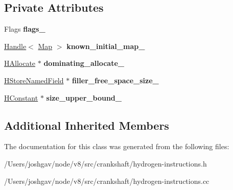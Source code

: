 \subsection*{Private Attributes}
\begin{DoxyCompactItemize}
\item 
Flags {\bfseries flags\+\_\+}\hypertarget{classv8_1_1internal_1_1_h_allocate_a38c796e879659e65ce9782c57d71e6f6}{}\label{classv8_1_1internal_1_1_h_allocate_a38c796e879659e65ce9782c57d71e6f6}

\item 
\hyperlink{classv8_1_1internal_1_1_handle}{Handle}$<$ \hyperlink{classv8_1_1internal_1_1_map}{Map} $>$ {\bfseries known\+\_\+initial\+\_\+map\+\_\+}\hypertarget{classv8_1_1internal_1_1_h_allocate_aa723fca59acf547a7d3f2ffe1f299384}{}\label{classv8_1_1internal_1_1_h_allocate_aa723fca59acf547a7d3f2ffe1f299384}

\item 
\hyperlink{classv8_1_1internal_1_1_h_allocate}{H\+Allocate} $\ast$ {\bfseries dominating\+\_\+allocate\+\_\+}\hypertarget{classv8_1_1internal_1_1_h_allocate_a9b992e95d35e7bbcee9b736af8b169fc}{}\label{classv8_1_1internal_1_1_h_allocate_a9b992e95d35e7bbcee9b736af8b169fc}

\item 
\hyperlink{classv8_1_1internal_1_1_h_store_named_field}{H\+Store\+Named\+Field} $\ast$ {\bfseries filler\+\_\+free\+\_\+space\+\_\+size\+\_\+}\hypertarget{classv8_1_1internal_1_1_h_allocate_a81c85cd0eaaeeac78e4fbd3920edc6f5}{}\label{classv8_1_1internal_1_1_h_allocate_a81c85cd0eaaeeac78e4fbd3920edc6f5}

\item 
\hyperlink{classv8_1_1internal_1_1_h_constant}{H\+Constant} $\ast$ {\bfseries size\+\_\+upper\+\_\+bound\+\_\+}\hypertarget{classv8_1_1internal_1_1_h_allocate_ae148e2f5b0743a49b4f3ccbb02df964d}{}\label{classv8_1_1internal_1_1_h_allocate_ae148e2f5b0743a49b4f3ccbb02df964d}

\end{DoxyCompactItemize}
\subsection*{Additional Inherited Members}


The documentation for this class was generated from the following files\+:\begin{DoxyCompactItemize}
\item 
/\+Users/joshgav/node/v8/src/crankshaft/hydrogen-\/instructions.\+h\item 
/\+Users/joshgav/node/v8/src/crankshaft/hydrogen-\/instructions.\+cc\end{DoxyCompactItemize}
